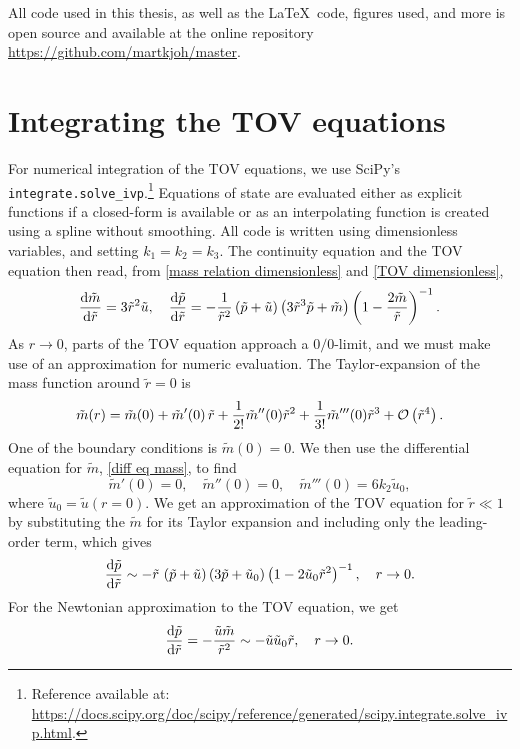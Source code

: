 \label{appendix: code} 
 
All code used in this thesis, as well as the \LaTeX\, code, figures used, and more is open source and available at the online repository \url{https://github.com/martkjoh/master}.


\section{Integrating the TOV equations}

For numerical integration of the TOV equations, we use SciPy's \texttt{integrate.solve\_ivp}.\footnote{
    Reference available at: \url{https://docs.scipy.org/doc/scipy/reference/generated/scipy.integrate.solve_ivp.html}.
    }
Equations of state are evaluated either as explicit functions if a closed-form is available or as an interpolating function is created using a spline without smoothing.
All code is written using dimensionless variables, and setting $k_1 = k_2 = k_3$.
The continuity equation and the TOV equation then read, from \autoref{mass relation dimensionless} and \autoref{TOV dimensionless},
%
\begin{align}
    \odv{\tilde m}{\tilde r} 
    = 3 \tilde r^2 \tilde u, \quad
    \odv{\tilde p}{\tilde r} 
     = - \frac{1}{\tilde r^2} \left(\tilde p + \tilde u\right) 
    \left(3  \tilde r^3 \tilde p + \tilde m\right) 
    \left(1 - \frac{2 \tilde m}{\tilde r}\right)^{-1}.
\end{align}
%
As $r \rightarrow 0$, parts of the TOV equation approach a $0/0$-limit, and we must make use of an approximation for numeric evaluation.
The Taylor-expansion of the mass function around $\tilde r = 0$ is
%
\begin{equation}
    \tilde m(r) = \tilde m(0) + \tilde m'(0) \, \tilde r + \frac{1}{2!} \tilde m''(0) \tilde r^2
    + \frac{1}{3!} \tilde m'''(0) \tilde r^3 + \mathcal O\left(\tilde r^4\right).
\end{equation}
%
One of the boundary conditions is $\tilde m(0) = 0$.
We then use the differential equation for $\tilde m$, \autoref{diff eq mass}, to find
%
\begin{equation}
    \tilde m'(0) = 0, \quad
    \tilde m''(0) = 0, \quad
    \tilde m'''(0) = 6 k_2 \tilde u_0,
\end{equation}
%
where $\tilde u_0 = \tilde u(r = 0)$.
We get an approximation of the TOV equation for $\tilde r \ll 1$ by substituting the $\tilde m$ for its Taylor expansion and including only the leading-order term, which gives
%
\begin{equation}
    \odv{\tilde p}{\tilde r}
    \sim - \tilde r \, \left(\tilde p + \tilde u\right)
    \left( 3 \tilde p + \tilde u_0  \right)
    \left(1 - 2 \tilde u_0 \tilde r^2\right)^{-1}, \quad r\rightarrow 0.
\end{equation}
%
For the Newtonian approximation to the TOV equation, we get
%
\begin{equation}
    \odv{\tilde p}{\tilde r} = -\frac{\tilde u \tilde m}{\tilde r^2}
    \sim - \tilde u \tilde u_0 \tilde r,  \quad r\rightarrow 0.
\end{equation}

